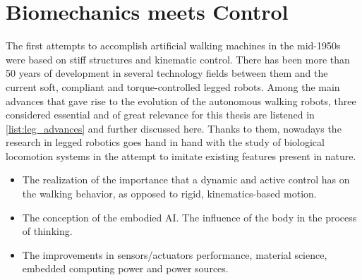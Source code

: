 
\section{Biomechanics meets Control} %
\label{sec:biomechanics_vs_control}
The first attempts to accomplish artificial walking machines in the mid-1950s were based on stiff structures and kinematic control.
There has been more than 50 years of development in several technology fields between them and the current soft, compliant and torque-controlled legged robots.
Among the main advances that gave rise to the evolution of the autonomous walking robots, three considered essential and of great relevance for this thesis are listened in \ref{list:leg_advances} and further discussed here.
Thanks to them, nowadays the research in legged robotics goes hand in hand with the study of biological locomotion systems in the attempt to imitate existing features present in nature.

\begin{itemize}
\label{list:leg_advances}
	\item The realization of the importance that a dynamic and active control has on the walking behavior, as opposed to rigid, kinematics-based motion.
	\item The conception of the embodied AI. The influence of the body in the process of thinking.
	\item The improvements in sensors/actuators performance, material science, embedded computing power and power sources.
\end{itemize}

